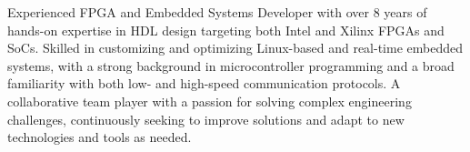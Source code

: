 

\begin{cvparagraph}
Experienced FPGA and Embedded Systems Developer with over 8 years of hands-on expertise in HDL design targeting both Intel and Xilinx FPGAs and SoCs. Skilled in customizing and optimizing Linux-based and real-time embedded systems, with a strong background in microcontroller programming and a broad familiarity with both low- and high-speed communication protocols. A collaborative team player with a passion for solving complex engineering challenges, continuously seeking to improve solutions and adapt to new technologies and tools as needed.
\end{cvparagraph}
